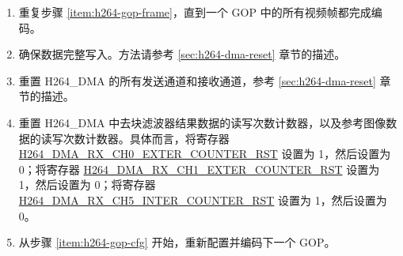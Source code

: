 \documentclass[main\_\_CN.tex]{subfiles}
\begin{document}
\begin{enumerate}
\begin{itemize}
\begin{enumerate}
            \item 重置 H264\_DMA TX 通道 2 和 RX 通道 2：配置方法请参考 \ref{sec:h264-dma-reset} 章节的描述。
            \item 重置 H264\_DMA 中去块滤波器中间数据的读写次数计数器：将寄存器 \hyperref[fielddesc:H264DMARXCH2INTERCOUNTERRST]{H264\_DMA\_RX\_CH2\_INTER\_COUNTER\_RST} 设置为 1，然后设置为 0。
        \end{enumerate}
        \item 可以在任何帧编码结束后重新配置以下寄存器：
        \begin{itemize}
            \item 与量化结果降采样功能相关的寄存器，参考 \ref{sec:h264-decimate} 章节的描述。
            \item 与宏块级别码率控制功能相关的寄存器，参考\ref{sec:h264-rate-ctrl}章节的描述。
            \item 去块滤波器使能寄存器：\hyperref[fielddesc:H264ABYPASSDBFILTER]{H264\_A\_BYPASS\_DB\_FILTER}。
            \item ROI 功能相关的寄存器，参考 \ref{sec:h264-roi} 章节的描述。
            \item 与切片头信息相关的寄存器：\hyperref[fielddesc:H264SLICEREMAINBIT]{H264\_SLICE\_REMAIN\_BIT}、\hyperref[fielddesc:H264SLICEREMAINBITLENGTH]{H264\_SLICE\_REMAIN\_BITLENGTH}、\hyperref[fielddesc:H264SLICEBYTELENGTH]{H264\_SLICE\_BYTE\_LENGTH}、\hyperref[fielddesc:H264SLICEBYTELSB]{H264\_SLICE\_BYTE\_LSB} 和 \hyperref[fielddesc:H264SLICEBYTEMSB]{H264\_SLICE\_BYTE\_MSB}。
            \item 与 MV 合并功能相关的寄存器，参考 \ref{sec:h264-mv-merge} 章节的描述。
            \item 与调试功能相关的寄存器，参考 \ref{sec:h264-debug-func} 章节的描述。
        \end{itemize}
    \end{itemize}
    \item 重复步骤 \ref{item:h264-gop-frame}，直到一个 GOP 中的所有视频帧都完成编码。
    \item 确保数据完整写入。方法请参考 \ref{sec:h264-dma-reset} 章节的描述。
    \item 重置 H264\_DMA 的所有发送通道和接收通道，参考 \ref{sec:h264-dma-reset} 章节的描述。
    \item 重置 H264\_DMA 中去块滤波器结果数据的读写次数计数器，以及参考图像数据的读写次数计数器。具体而言，将寄存器 \hyperref[fielddesc:H264DMARXCH0EXTERCOUNTERRST]{H264\_DMA\_RX\_CH0\_EXTER\_COUNTER\_RST} 设置为 1，然后设置为 0；将寄存器 \hyperref[fielddesc:H264DMARXCH1EXTERCOUNTERRST]{H264\_DMA\_RX\_CH1\_EXTER\_COUNTER\_RST} 设置为 1，然后设置为 0；将寄存器\hyperref[fielddesc:H264DMARXCH5INTERCOUNTERRST]{H264\_DMA\_RX\_CH5\_INTER\_COUNTER\_RST} 设置为 1，然后设置为 0。
    \item 从步骤 \ref{item:h264-gop-cfg} 开始，重新配置并编码下一个 GOP。
\end{enumerate}
\end{document}
